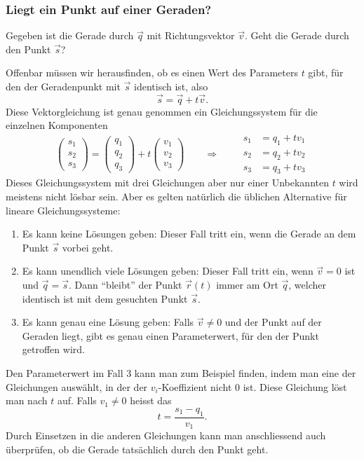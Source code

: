 \subsubsection{Liegt ein Punkt auf einer Geraden?}
\begin{aufgabe}
Gegeben ist die Gerade durch $\vec q$ mit Richtungsvektor $\vec v$.
Geht die
Gerade durch den Punkt $\vec s$?
\end{aufgabe}
Offenbar müssen wir herausfinden, ob es
einen Wert des Parameters $t$ gibt, für den der Geradenpunkt mit $\vec s$
identisch ist, also
\[
\vec s = \vec q + t\vec v.
\]
Diese Vektorgleichung ist genau genommen ein Gleichungssystem für die einzelnen
Komponenten
\[
\begin{pmatrix}
s_1\\s_2\\s_3
\end{pmatrix}
=
\begin{pmatrix}
q_1\\q_2\\q_3
\end{pmatrix}
+t
\begin{pmatrix}
v_1\\v_2\\v_3
\end{pmatrix}
\qquad
\Rightarrow
\qquad
\begin{aligned}
s_1&=q_1+tv_1\\
s_2&=q_2+tv_2\\
s_3&=q_3+tv_3
\end{aligned}
\]
Dieses Gleichungssystem mit drei Gleichungen aber nur einer Unbekannten $t$
wird meistens nicht lösbar sein.
Aber es gelten natürlich die üblichen Alternative
für lineare Gleichungssysteme:
\begin{enumerate}
\item Es kann keine Lösungen geben: Dieser Fall tritt ein, wenn die Gerade
an dem Punkt $\vec{s}$ vorbei geht.
\item Es kann unendlich viele Lösungen geben: Dieser Fall tritt ein, wenn
$\vec v=0$ ist und $\vec q=\vec s$.
Dann ``bleibt'' der Punkt $\vec r(t)$
immer am Ort $\vec q$, welcher identisch ist mit dem gesuchten Punkt $\vec s$.
\item Es kann genau eine Lösung geben: Falls $\vec v\ne 0$ und der Punkt auf der
Geraden liegt, gibt es genau einen Parameterwert, für den der Punkt
getroffen wird.
\end{enumerate}
Den Parameterwert im Fall 3 kann man zum Beispiel finden, indem man eine
der Gleichungen auswählt, in der der $v_i$-Koeffizient nicht $0$ ist.
Diese Gleichung löst man nach $t$ auf.
Falls $v_1\ne 0$ heisst das
\[
t=\frac{s_1-q_1}{v_1}.
\]
Durch Einsetzen in die anderen Gleichungen kann man anschliessend auch überprüfen,
ob die Gerade tatsächlich durch den Punkt geht.

